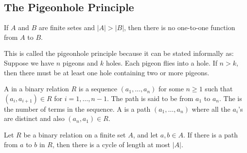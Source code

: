 \subsection{The Pigeonhole Principle}

\begin{thm}
If $A$ and $B$ are finite setes and $|A| > |B|$, then there is no one-to-one function from $A$ to $B$.
\end{thm}

\begin{discussion}
This is called the pigeonhole principle because it can be stated informally  as: Suppose we have $n$ pigeons and $k$ holes. Each pigeon flies into a hole. If $n > k$, then there must be at least one hole containing two or more pigeons.
\end{discussion}

\begin{defn}
A  in a binary relation $R$ is a sequence $(a_1, \ldots, a_n)$ for some $n \geq 1$ such that $(a_i, a_{i+1}) \in R$ for $i = 1,\ldots,n-1$. The path is said to be from $a_1$ to $a_n$. The  is the number of terms in the sequence. A  is a path $(a_1, \ldots, a_n)$ where all the $a_i$'s are distinct and also $(a_n, a_1) \in R$.
\end{defn}

\begin{stmt}
Let $R$ be a binary relation on a finite set $A$, and let $a, b \in A$. If there is a path from $a$ to $b$ in $R$, then there is a cycle of length at most $|A|$.
\end{stmt}

